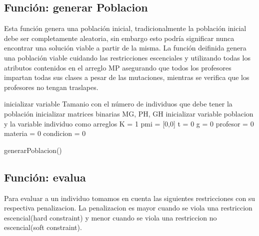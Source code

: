 \subsection{Funci\'on: generar Poblacion}

Esta función genera una población inicial, tradicionalmente la población inicial debe ser completamente aleatoria, sin embargo esto podría significar nunca encontrar una solución viable a partir de la misma. La función deifinida genera una población viable cuidando  las restricciones escenciales y utilizando todas los atributos contenidos en el arreglo MP asegurando que todos los profesores impartan todas sus clases a pesar de las mutaciones, mientras se verifica que los profesores no tengan traslapes.

\begin{algorithm}[H]
	\DontPrintSemicolon
	\SetAlgoLined
	inicializar variable Tamanio con el n\'umero de individuos que debe tener la poblaci\'on\;
	inicializar matrices binarias MG, PH, GH\;
	inicializar variable poblacion y la variable individuo como arreglos\;
	K = 1\;
	pmi = [0,0] \;
	t = 0\;
	g = 0\;
	profesor = 0\;
	materia = 0\;
	condicion = 0\;
	
	\caption{generarPoblacion()}
\end{algorithm}

\subsection{Funci\'on: evalua}

Para evaluar a un individuo tomamos en cuenta las siguientes restricciones con su respectiva penalizacion. La penalizacion es mayor cuando se viola una restriccion escencial(hard constraint) y menor cuando se viola una restriccion no escencial(soft constraint).

